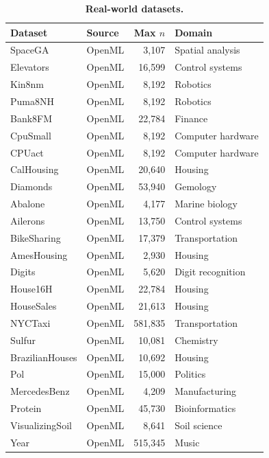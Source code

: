 \documentclass{article}
\begin{document}
\begin{table}[p]
\centering
\caption{\textbf{Real-world datasets.}}
\label{tab:real_datasets}
\small
\begin{tabular}{llrl}
\toprule
\textbf{Dataset} & \textbf{Source} & \textbf{Max $n$} & \textbf{Domain} \\
\midrule
SpaceGA          & OpenML &    3{,}107 & Spatial analysis \\
Elevators        & OpenML &   16{,}599 & Control systems \\
Kin8nm           & OpenML &    8{,}192 & Robotics \\
Puma8NH          & OpenML &    8{,}192 & Robotics \\
Bank8FM          & OpenML &   22{,}784 & Finance \\
CpuSmall         & OpenML &    8{,}192 & Computer hardware \\
CPUact           & OpenML &    8{,}192 & Computer hardware \\
CalHousing       & OpenML &   20{,}640 & Housing \\
Diamonds         & OpenML &   53{,}940 & Gemology \\
Abalone          & OpenML &    4{,}177 & Marine biology \\
Ailerons         & OpenML &   13{,}750 & Control systems \\
BikeSharing      & OpenML &   17{,}379 & Transportation \\
AmesHousing      & OpenML &    2{,}930 & Housing \\
Digits           & OpenML &    5{,}620 & Digit recognition \\
House16H         & OpenML &   22{,}784 & Housing \\
HouseSales       & OpenML &   21{,}613 & Housing \\
NYCTaxi          & OpenML &  581{,}835 & Transportation \\
Sulfur           & OpenML &   10{,}081 & Chemistry \\
BrazilianHouses  & OpenML &   10{,}692 & Housing \\
Pol              & OpenML &   15{,}000 & Politics \\
MercedesBenz     & OpenML &    4{,}209 & Manufacturing \\
Protein          & OpenML &   45{,}730 & Bioinformatics \\
VisualizingSoil  & OpenML &    8{,}641 & Soil science \\
Year             & OpenML &  515{,}345 & Music \\

\end{tabular}
\end{table}
\end{document}
